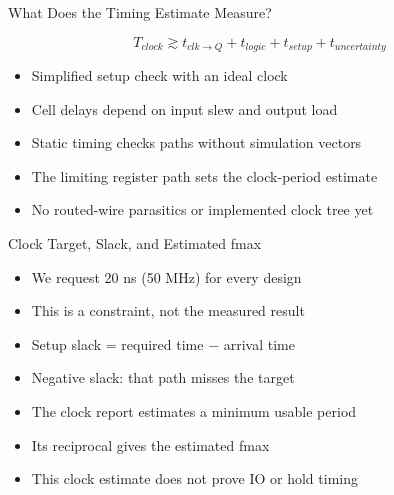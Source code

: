 \begin{frame}{What Does the Timing Estimate Measure?}
\begin{center}
\end{center}
\[
 T_{clock} \gtrsim t_{clk\rightarrow Q} + t_{logic}
                   + t_{setup} + t_{uncertainty}
\]
\begin{itemize}
\item Simplified setup check with an ideal clock
\item Cell delays depend on input slew and output load
\item Static timing checks paths without simulation vectors
\item The limiting register path sets the clock-period estimate
\item No routed-wire parasitics or implemented clock tree yet
\end{itemize}
\end{frame}

\begin{frame}{Clock Target, Slack, and Estimated fmax}
\begin{itemize}
\item We request 20 ns (50 MHz) for every design
\item This is a constraint, not the measured result
\item Setup slack = required time $-$ arrival time
\item Negative slack: that path misses the target
\item The clock report estimates a minimum usable period
\item Its reciprocal gives the estimated fmax
\item This clock estimate does not prove IO or hold timing
\end{itemize}
\end{frame}

